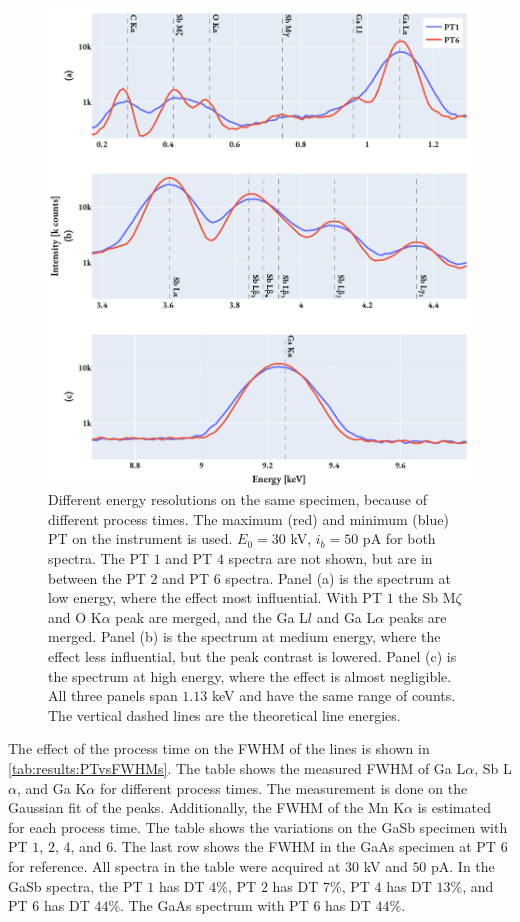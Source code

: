 \begin{figure}[hptb]
    \centering
    \includegraphics[width=0.95\linewidth]{figures/results/eds_energyResolutions_process_time.pdf}
    \caption{
        Different energy resolutions on the same specimen, because of different process times.
        The maximum (red) and minimum (blue) PT on the instrument is used.
        $E_0 = 30$ kV, $i_b = 50$ pA for both spectra.
        The PT $1$ and PT $4$ spectra are not shown, but are in between the PT $2$ and PT $6$ spectra.
        Panel (a) is the spectrum at low energy, where the effect most influential.
        With PT $1$ the Sb M$\zeta$ and O K$\alpha$ peak are merged, and the Ga L$l$ and Ga L$\alpha$ peaks are merged.
        Panel (b) is the spectrum at medium energy, where the effect less influential, but the peak contrast is lowered.
        Panel (c) is the spectrum at high energy, where the effect is almost negligible.
        All three panels span $1.13$ keV and have the same range of counts.
        The vertical dashed lines are the theoretical line energies.
    }
    \label{fig:results:energy_resolutions_process_time}
\end{figure}


The effect of the process time on the FWHM of the lines is shown in \cref{tab:results:PTvsFWHMs}.
The table shows the measured FWHM of Ga L$\alpha$, Sb L$\alpha$, and Ga K$\alpha$ for different process times.
The measurement is done on the Gaussian fit of the peaks.
Additionally, the FWHM of the Mn K$\alpha$ is estimated for each process time.
The table shows the variations on the GaSb specimen with PT $1$, $2$, $4$, and $6$.
The last row shows the FWHM in the GaAs specimen at PT $6$ for reference.
All spectra in the table were acquired at $30$ kV and $50$ pA.
In the GaSb spectra, the PT $1$ has DT $4$\%, PT $2$ has DT $7$\%, PT $4$ has DT $13$\%, and PT $6$ has DT $44$\%.
The GaAs spectrum with PT $6$ has DT $44$\%.


